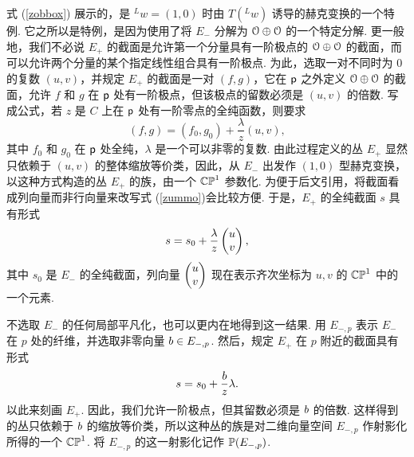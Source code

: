 式 (\ref{zobbox}) 展示的，是 $^Lw=(1,0)$ 时由 $T(^Lw)$ 诱导的赫克变换的一个特例.
它之所以是特例，是因为使用了将 $E_-$ 分解为 $\O\oplus \O$ 的一个特定分解.
更一般地，我们不必说 $E_+$ 的截面是允许第一个分量具有一阶极点的 $\O\oplus\O$ 的截面，而可以允许两个分量的某个指定线性组合具有一阶极点.
为此，选取一对不同时为 0 的复数 $(u,v)$，并规定 $E_+$ 的截面是一对 $(f,g)$，它在 $\pp$ 之外定义 $\O\oplus \O$ 的截面，允许 $f$ 和 $g$ 在 $\pp$ 处有一阶极点，但该极点的留数必须是 $(u,v)$ 的倍数.
写成公式，若 $z$ 是 $C$ 上在 $\pp$ 处有一阶零点的全纯函数，则要求
\begin{equation}\label{zummo} (f,g)=(f_0,g_0)+\frac{\lambda}{z}(u,v), \end{equation}
其中 $f_0$ 和 $g_0$ 在 $\pp$ 处全纯，$\lambda$ 是一个可以非零的复数.
由此过程定义的丛 $E_+$ 显然只依赖于 $(u,v)$ 的整体缩放等价类，因此，从 $E_-$ 出发作 $(1,0)$ 型赫克变换，以这种方式构造的丛 $E_+$ 的族，由一个 $\CP^1$ 参数化.
为便于后文引用，将截面看成列向量而非行向量来改写式 (\ref{zummo})会比较方便.
于是，$E_+$ 的全纯截面 $s$ 具有形式
\begin{equation}\label{onkey}s=s_0+\frac{\lambda}{z}\begin{pmatrix}u \cr v\end{pmatrix}, \end{equation}
其中 $s_0$ 是 $E_-$ 的全纯截面，列向量 $\begin{pmatrix} u\cr v\end{pmatrix}$ 现在表示齐次坐标为 $u,v$ 的 $\CP^1$ 中的一个元素.


不选取 $E_-$ 的任何局部平凡化，也可以更内在地得到这一结果.
用 $E_{-,p}$ 表示 $E_-$ 在 $p$ 处的纤维，并选取非零向量 $\bb\in E_{-,p}$.
然后，规定 $E_+$ 在 $p$ 附近的截面具有形式
\begin{equation}s=s_0+\frac{\bb}{z}\lambda. \end{equation}
以此来刻画 $E_+$.
因此，我们允许一阶极点，但其留数必须是 $\bb$ 的倍数.
这样得到的丛只依赖于 $\bb$ 的缩放等价类，所以这种丛的族是对二维向量空间 $E_{-,p}$ 作射影化所得的一个 $\CP^1$.
将 $E_{-,p}$ 的这一射影化记作 $\Bbb P(E_{-,p})$.

